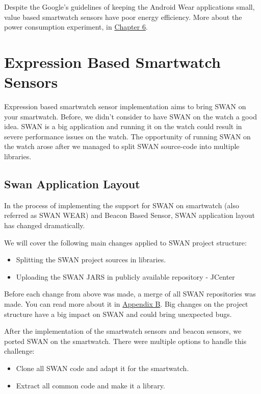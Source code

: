 Despite the Google's guidelines of keeping the Android Wear applications small, value based smartwatch sensors have poor energy efficiency. More about the power consumption experiment, 
in \hyperref[Chapter6]{Chapter 6}.



\section{Expression  Based  Smartwatch Sensors }
Expression based smartwatch sensor implementation aims to bring SWAN on your smartwatch. Before, we didn't consider to have SWAN on the watch a good idea. SWAN is a big application and running
it on the watch could result in severe performance issues on the watch. The opportunity of running SWAN on the watch arose after we managed to split SWAN source-code into multiple libraries. 


\subsection{Swan Application Layout}
In the process of implementing the support for SWAN on smartwatch (also referred as SWAN WEAR) and Beacon Based Sensor, SWAN application layout has changed dramatically.

We will cover the following main changes applied to SWAN project structure:
\begin{itemize}
 \item Splitting the SWAN project sources in libraries.
 \item Uploading the SWAN JARS in publicly available repository - JCenter
\end{itemize}

Before each change  from above was made,  a merge of all SWAN repositories was made. You can read more about it in \hyperref[AppendixB]{Appendix B}.
Big changes on the project structure have a big impact on SWAN and could bring unexpected bugs.


After the implementation of the smartwatch sensors and beacon sensors, we ported SWAN on the smartwatch.\label{scc:swan_split}
There were multiple options to handle this challenge:
\begin{itemize}
 \item Clone all SWAN code and adapt it for the smartwatch.
 \item Extract all common code and make it a library.
\end{itemize}

